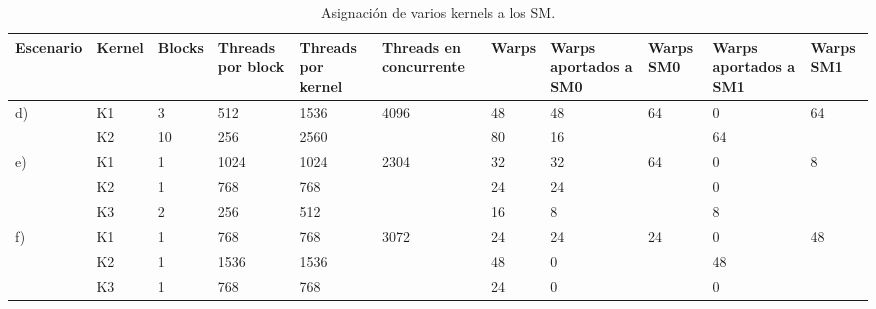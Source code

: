     \begin{table}[h!]
      \begin{center}
            \scriptsize
        \begin{tabular}{|m{1.5cm}|m{1cm}|m{1cm}|m{1cm}|m{1cm}|m{1cm}|m{1cm}|m{1cm}|m{1cm}|m{1cm}|m{1cm}|}
         \hline
         \cellcolor{lightgray}\textbf{Escenario} & 
         \cellcolor{lightgray}\textbf{Kernel} & 
         \cellcolor{lightgray}\textbf{Blocks} &
         \cellcolor{lightgray}\textbf{Threads por block} &
         \cellcolor{lightgray}\textbf{Threads por kernel} &
         \cellcolor{lightgray}\textbf{Threads en concurrente} &
         \cellcolor{lightgray}\textbf{Warps} &
         \cellcolor{lightgray}\textbf{Warps aportados a SM0} &
         \cellcolor{lightgray}\textbf{Warps SM0} &
         \cellcolor{lightgray}\textbf{Warps aportados a SM1} &
         \cellcolor{lightgray}\textbf{Warps SM1} \\ 
         \hline
         \multirow{2}{1cm}{d)} & K1 & 3  & 512 & 1536 & \multirow{2}{1cm}{4096} & 48 & 48 & \multirow{2}{1cm}{64} & 0  & \multirow{2}{1cm}{64}\\ 
                              & K2 & 10 & 256 & 2560 &                         & 80 & 16 &                       & 64 & \\ 
         \hline \hline
        \multirow{3}{1cm}{e)} & K1 & 1 & 1024 & 1024 & \multirow{3}{1cm}{2304} & 32 & 32 & \multirow{3}{1cm}{64} & 0  & \multirow{3}{1cm}{8}\\ 
                             & K2 & 1 & 768  & 768  &                         & 24 & 24 &                      & 0 & \\ 
                             & K3 & 2 & 256  & 512  &                         & 16 & 8 &                       & 8 & \\ 
         \hline \hline
        \multirow{3}{1cm}{f)} & K1 & 1 & 768  & 768  & \multirow{3}{1cm}{3072} & 24 & 24 & \multirow{3}{1cm}{24} & 0  & \multirow{3}{1cm}{48}\\ 
                             & K2 & 1 & 1536 & 1536 &                         & 48 & 0  &                       & 48 & \\ 
                             & K3 & 1 & 768  & 768  &                         & 24 & 0  &                       & 0 & \\ 
         \hline
           \end{tabular}
        \caption{Asignación de varios kernels a los SM.}
        \label{tab:asigVariosKernelsSM}
      \end{center}
    \end{table}
    
